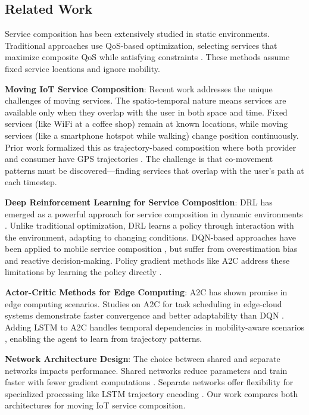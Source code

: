 \documentclass[10pt,twocolumn]{article}
\begin{document}
\subsection{Related Work}\label{related-work}

Service composition has been extensively studied in static environments.
Traditional approaches use QoS-based optimization, selecting services
that maximize composite QoS while satisfying constraints \cite{huang2023}. These
methods assume fixed service locations and ignore mobility.

\textbf{Moving IoT Service Composition}: Recent work addresses the
unique challenges of moving services. The spatio-temporal nature means
services are available only when they overlap with the user in both
space and time. Fixed services (like WiFi at a coffee shop) remain at
known locations, while moving services (like a smartphone hotspot while
walking) change position continuously. Prior work formalized this as
trajectory-based composition where both provider and consumer have GPS
trajectories \cite{neiat2021}. The challenge is that co-movement patterns must be
discovered---finding services that overlap with the user's path at each
timestep.

\textbf{Deep Reinforcement Learning for Service Composition}: DRL has
emerged as a powerful approach for service composition in dynamic
environments \nocite{sutton2018}. Unlike traditional optimization, DRL learns a policy
through interaction with the environment, adapting to changing
conditions. DQN-based approaches have been applied to mobile service
composition \cite{neiat2021}, but suffer from overestimation bias and reactive
decision-making. Policy gradient methods like A2C address these
limitations by learning the policy directly \nocite{mnih2016}.

\textbf{Actor-Critic Methods for Edge Computing}: A2C has shown promise
in edge computing scenarios. Studies on A2C for task scheduling in
edge-cloud systems demonstrate faster convergence and better
adaptability than DQN \cite{chen2020}\cite{liu2024a}. Adding LSTM to A2C handles
temporal dependencies in mobility-aware scenarios \nocite{chen2020}, enabling the
agent to learn from trajectory patterns.

\textbf{Network Architecture Design}: The choice between shared and
separate networks impacts performance. Shared networks reduce parameters
and train faster with fewer gradient computations \nocite{mnih2016}. Separate networks
offer flexibility for specialized processing like LSTM trajectory
encoding \nocite{chen2020}. Our work compares both architectures for moving
IoT service composition.
\end{document}
